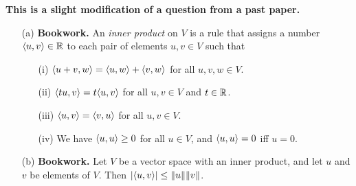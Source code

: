 \documentclass[a4paper]{article}
\begin{document}
\begin{solution}
 \textbf{This is a slight modification of a question from a past paper.}
 \begin{itemize}
  \item[(a)] \textbf{Bookwork.}
   An \emph{inner product} on $V$ is a rule that
   assigns a number $\langle u,v\rangle\in{\mathbb{R}}$ to each pair of elements
   $u,v\in V$ such that
   \begin{itemize}
    \item[(i)] $\langle u+v,w\rangle=\langle u,w\rangle+\langle v,w\rangle$ for all
     $u,v,w\in V$.\mk
    \item[(ii)] $\langle tu,v\rangle=t\langle u,v\rangle$ for all $u,v\in V$ and
     $t\in{\mathbb{R}}$.\mk
    \item[(iii)] $\langle u,v\rangle=\langle v,u\rangle$ for all $u,v\in V$. \mk
    \item[(iv)] We have $\langle u,u\rangle\geq 0$ for all $u\in V$, \mk and
     $\langle u,u\rangle=0$ iff $u=0$. \mk
   \end{itemize}
  \item[(b)] \textbf{Bookwork.}
   Let $V$ be a vector space with an inner product, and let
   $u$ and $v$ be elements of $V$.  Then $|\langle u,v\rangle|\leq \|u\|\|v\|$.


\end{itemize}
\end{solution}
\end{document}
